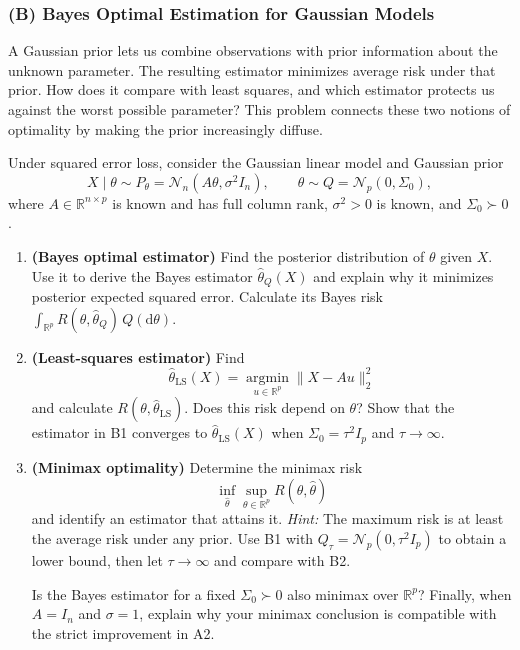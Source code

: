 \subsubsection*{(B) Bayes Optimal Estimation for Gaussian Models}
{}
\label{ex:gaussian-bayes}

A Gaussian prior lets us combine observations with prior information about the unknown parameter.
The resulting estimator minimizes average risk under that prior. How does it compare with least squares,
and which estimator protects us against the worst possible parameter? This problem connects these two
notions of optimality by making the prior increasingly diffuse.

Under squared error loss, consider the Gaussian linear model and Gaussian prior
\[
 X\mid\theta\sim P_\theta=\mathcal N_n(A\theta,\sigma^2 I_n),\qquad
 \theta\sim Q=\mathcal N_p(0,\Sigma_0),
\]
where $A\in\mathbb R^{n\times p}$ is known and has full column rank, $\sigma^2>0$ is known, and $\Sigma_0\succ0$.

\begin{enumerate}[label=\textcolor{AccentInk}{\sffamily\bfseries B\arabic*.},ref=B\arabic*,leftmargin=2.65em,labelsep=0.65em,itemsep=1em]
\item \textbf{(Bayes optimal estimator)} Find the posterior distribution of $\theta$ given $X$. Use it to derive the Bayes estimator $\hat\theta_Q(X)$ and explain why it minimizes posterior expected squared error. Calculate its Bayes risk $\int_{\mathbb R^p}R(\theta,\hat\theta_Q)\,Q(\mathrm d\theta)$.

\item \textbf{(Least-squares estimator)} Find
\[
 \hat\theta_{\mathrm{LS}}(X)=\operatorname*{argmin}_{u\in\mathbb R^p}\|X-Au\|_2^2
\]
and calculate $R(\theta,\hat\theta_{\mathrm{LS}})$. Does this risk depend on $\theta$? Show that the estimator in B1 converges to $\hat\theta_{\mathrm{LS}}(X)$ when $\Sigma_0=\tau^2 I_p$ and $\tau\to\infty$.

\item \textbf{(Minimax optimality)} Determine the minimax risk
\[
 \inf_{\hat\theta}\sup_{\theta\in\mathbb R^p}R(\theta,\hat\theta)
\]
and identify an estimator that attains it. \emph{Hint:} The maximum risk is at least the average risk under any prior. Use B1 with $Q_\tau=\mathcal N_p(0,\tau^2 I_p)$ to obtain a lower bound, then let $\tau\to\infty$ and compare with B2.

Is the Bayes estimator for a fixed $\Sigma_0\succ0$ also minimax over $\mathbb R^p$? Finally, when $A=I_n$ and $\sigma=1$, explain why your minimax conclusion is compatible with the strict improvement in A2.
\end{enumerate}

